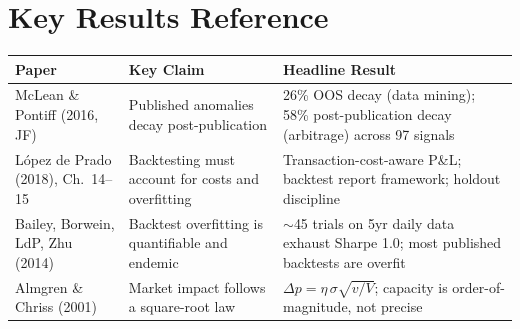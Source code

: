 \section*{Key Results Reference}
\label{sec:ch12-key-results}

\begin{center}
\begin{tabular}{p{4.2cm} p{4.5cm} p{5cm}}
\toprule
\textbf{Paper} & \textbf{Key Claim} & \textbf{Headline Result} \\
\midrule
McLean \& Pontiff (2016, JF) & Published anomalies decay post-publication & 26\% OOS decay (data mining); 58\% post-publication decay (arbitrage) across 97 signals \\
\addlinespace
L\'{o}pez de Prado (2018), Ch.~14--15 & Backtesting must account for costs and overfitting & Transaction-cost-aware P\&L; backtest report framework; holdout discipline \\
\addlinespace
Bailey, Borwein, LdP, Zhu (2014) & Backtest overfitting is quantifiable and endemic & $\sim$45 trials on 5yr daily data exhaust Sharpe 1.0; most published backtests are overfit \\
\addlinespace
Almgren \& Chriss (2001) & Market impact follows a square-root law & $\Delta p = \eta\,\sigma\sqrt{v/V}$; capacity is order-of-magnitude, not precise \\
\bottomrule
\end{tabular}
\end{center}
